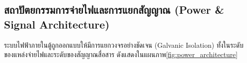     
    

    

    
    


\subsection{สถาปัตยกรรมการจ่ายไฟและการแยกสัญญาณ (Power \& Signal Architecture)}
\label{subsec:power_arch}

ระบบไฟฟ้าภายในตู้ถูกออกแบบให้มีการแยกวงจรอย่างชัดเจน (Galvanic Isolation) ทั้งในระดับของแหล่งจ่ายไฟและระดับของสัญญาณสื่อสาร ดังแสดงในแผนภาพ\cref{fig:power_architecture}

